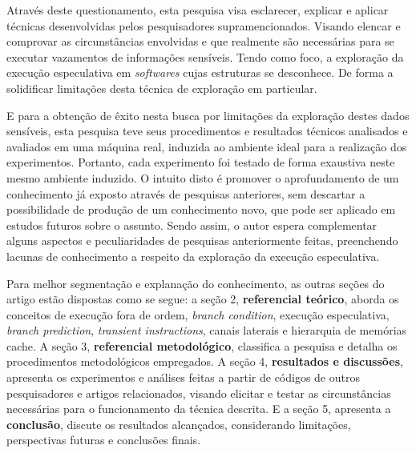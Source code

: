 \documentclass[
	article,			    %
	12pt,				    %
	oneside,			    %
	a4paper,			    %
	chapter=TITLE,		    %
	section=TITLE,		    %
	subsection=TITLE,	    %
	english,			    %
	brazil,				    %
	sumario=tradicional
]{abntex2}
\begin{document}
Através deste questionamento, esta pesquisa visa esclarecer, explicar e aplicar técnicas desenvolvidas pelos pesquisadores supramencionados. Visando elencar e comprovar as circunstâncias envolvidas e que realmente são necessárias para se executar vazamentos de informações sensíveis. Tendo como foco, a exploração da execução especulativa em \emph{softwares} cujas estruturas se desconhece. De forma a solidificar limitações desta técnica de exploração em particular.

E para a obtenção de êxito nesta busca por limitações da exploração destes dados sensíveis, esta pesquisa teve seus procedimentos e resultados técnicos analisados e avaliados em uma máquina real, induzida ao ambiente ideal para a realização dos experimentos. Portanto, cada experimento foi testado de forma exaustiva neste mesmo ambiente induzido. O intuito disto é promover o aprofundamento de um conhecimento já exposto através de pesquisas anteriores, sem descartar a possibilidade de produção de um conhecimento novo, que pode ser aplicado em estudos futuros sobre o assunto. Sendo assim, o autor espera complementar alguns aspectos e peculiaridades de pesquisas anteriormente feitas, preenchendo lacunas de conhecimento a respeito da exploração da execução especulativa.

Para melhor segmentação e explanação do conhecimento, as outras seções do artigo estão dispostas como se segue: a seção 2, \textbf{referencial teórico}, aborda os conceitos de execução fora de ordem, \emph{branch condition}, execução especulativa, \emph{branch prediction}, \emph{transient instructions}, canais laterais e hierarquia de memórias cache. A seção 3, \textbf{referencial metodológico}, classifica a pesquisa e detalha os procedimentos metodológicos empregados. A seção 4, \textbf{resultados e discussões}, apresenta os experimentos e análises feitas a partir de códigos de outros pesquisadores e artigos relacionados, visando elicitar e testar as circunstâncias necessárias para o funcionamento da técnica descrita. E a seção 5, apresenta a \textbf{conclusão}, discute os resultados alcançados, considerando limitações, perspectivas futuras e conclusões finais.

\end{document}
